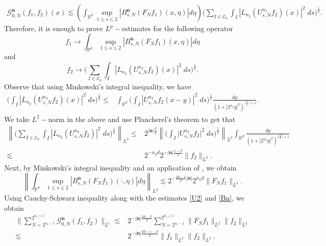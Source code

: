 \documentclass[a4paper,reqno]{amsart}
\numberwithin{equation}{section}
\newcommand{\R}{{\mathbb {R}}}
\begin{document}
	\begin{align*}
		\mathcal{G}^{\mathbf{n}}_{0,N}(f_1,f_2)(x)\lesssim\left(\int_{\mathbb{R}^{d}} \sup_{1 \leq s\leq 2}\left|B^{\mathbf{n}}_{s, N}\left(F_{N}f_1\right)(x, \eta)\right| d \eta\right)\bigg(\sum_{I\in \mathcal{E}_0}\int_I\left|L_{n_2}\left(U_{s,N}^{n_2}f_2\right)(x)\right|^2\;ds\bigg)^\frac{1}{2}.
	\end{align*}
	Therefore, it is enough to prove $L^p-$estimates for the following operator 
	\[f_1\rightarrow \int_{\mathbb{R}^{d}} \sup_{1 \leq s\leq 2}\left|B^{\mathbf{n}}_{s, N}\left(F_{N}f_1\right)(x, \eta)\right| d \eta\] 
	and 
	\[f_2\rightarrow \bigg(\sum_{I\in \mathcal{E}_0}\int_I\left|L_{n_2}\left(U_{s,N}^{n_2}f_2\right)(x)\right|^2\;ds\bigg)^\frac{1}{2}.\] 
	Observe that using Minkowski's integral inequality, we have
	\begin{align}\label{Lneq}
		\bigg(\int_I\left|L_{n_2}\left(U_{s,N}^{n_2}f_2\right)(x)\right|^2\;ds\bigg)^\frac{1}{2}\leq&\int_{\R^d}\bigg(\int_I\left|U_{s,N}^{n_2}f_2(x-y)\right|^2\;ds\bigg)^\frac{1}{2}\frac{dy}{\left(1+\left|2^{n_2}y\right|^{2}\right)^{\lceil \frac{d}{2}\rceil+1}}.
	\end{align}
	We take $L^2-$norm in the above and use Plancherel's theorem to get that 
	\begin{align}\label{U2}
		\left\|\bigg(\sum_{I\in \mathcal{E}_0}\int_I\left|L_{n_2}\left(U_{s,N}^{n_2}f_2\right)\right|^2\;ds\bigg)^\frac{1}{2}\right\|_{L^2}\leq&2^{|\mathbf{n}|\frac{\beta}{2}}\left\|\bigg(\int_I\big|U_{s,N}^{n_2}f_2\big|^2\;ds\bigg)^\frac{1}{2}\right\|_{L^2}\int_{\R^d}\frac{dy}{\left(1+\left|2^{n_2}y\right|^{2}\right)^{\lceil \frac{d}{2}\rceil+1}}\\
		\lesssim&\nonumber2^{-n_2d}2^{-|\mathbf{n}|\frac{1-\beta}{2}}\|f_2\|_{L^2}.
	\end{align}	
	Next, by Minkowski's integral inequality and an application of , we obtain
	\begin{equation}\label{Bn}
		\left\|\int_{\mathbb{R}^{d}} \sup_{1 \leq s\leq 2}\left|B^{\mathbf{n}}_{s, N}\left(F_{N}f_1\right)(\cdot, \eta)\right| d \eta\right\|_{L^2}\lesssim2^{-\frac{2d-1}{2}|\mathbf{n}|}2^{n_2d}\|F_Nf_1\|_{L^2}.
	\end{equation}
	Using Cauchy-Schwarz inequality along with the estimates \eqref{U2} and \eqref{Bn}, we obtain
	\begin{align*}
		\Bigg\|\sum_{N=2^{n_1-1}}^{2^{n_1+1}}\mathcal{G}^{\mathbf{n}}_{0,N}(f_1,f_2)\Bigg\|_{L^1}\lesssim&2^{-|\mathbf{n}|\frac{2d-\beta}{2}}\sum_{N=2^{n_1-1}}^{2^{n_1+1}}\|F_Nf_1\|_{L^2}\|f_2\|_{L^2}\\
		\lesssim&2^{-|\mathbf{n}|\frac{2d-1-\beta}{2}}\|f_1\|_{L^2}\|f_2\|_{L^2}.
	\end{align*}
	
\end{document}
